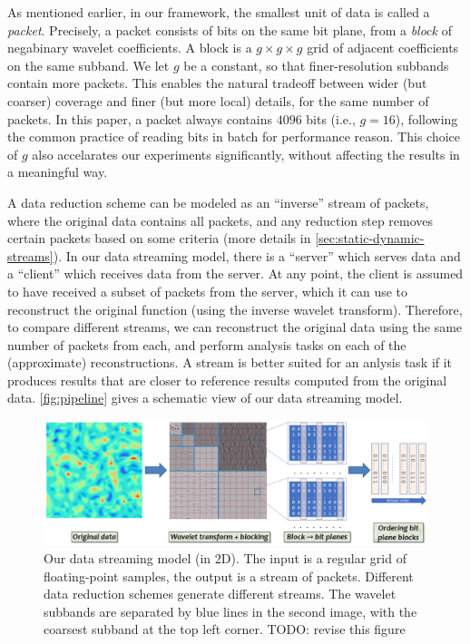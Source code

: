 As mentioned earlier, in our framework, the smallest unit of data is called a \emph{packet}.
Precisely, a packet consists of bits on the same bit plane, from a \emph{block} of negabinary
wavelet coefficients. A block is a $g\times g\times g$ grid of adjacent coefficients on the same
subband. We let $g$ be a constant, so that finer-resolution subbands contain more packets. This
enables the natural tradeoff between wider (but coarser) coverage and finer (but more local)
details, for the same number of packets. In this paper, a packet always contains $4096$ bits (i.e.,
$g=16$), following the common practice of reading bits in batch for performance reason. This choice
of $g$ also accelarates our experiments significantly, without affecting the results in a meaningful
way.

A data reduction scheme can be modeled as an ``inverse'' stream of packets, where the original data
contains all packets, and any reduction step removes certain packets based on some criteria (more
details in \autoref{sec:static-dynamic-streams}). In our data streaming model, there is a ``server''
which serves data and a ``client'' which receives data from the server. At any point, the client is
assumed to have received a subset of packets from the server, which it can use to reconstruct the
original function (using the inverse wavelet transform). Therefore, to compare different streams, we
can reconstruct the original data using the same number of packets from each, and perform analysis
tasks on each of the (approximate) reconstructions. A stream is better suited for an anlysis task if
it produces results that are closer to reference results computed from the original data.
\autoref{fig:pipeline} gives a schematic view of our data streaming model.

\begin{figure}[h]
  \centering
  \includegraphics[width=\linewidth]{img/pipeline.png}
  \caption{Our data streaming model (in 2D). The input is a regular grid of floating-point samples,
  the output is a stream of packets. Different data reduction schemes generate different streams.
  The wavelet subbands are separated by blue lines in the second image, with the coarsest subband at
  the top left corner. TODO: revise this figure}
\label{fig:pipeline}
\end{figure}

